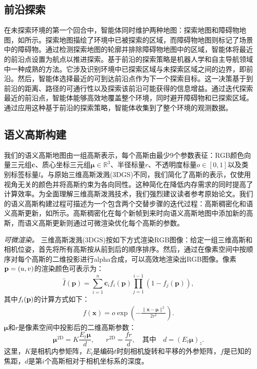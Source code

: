 \subsection{前沿探索}

在未探索环境的第一个回合中，智能体同时维护两种地图：探索地图和障碍物地图，如所示。探索地图描绘了环境中已被探索的区域，而障碍物地图则标记了场景中的障碍物。通过检测探索地图的轮廓并排除障碍物地图中的区域，智能体将最近的前沿点设置为航点以推进探索。基于前沿的探索策略是机器人学和自主导航领域中一种成熟的方法\cite{yamauchi1997frontier, holz2010evaluating}。它涉及识别环境中已探索区域与未探索区域之间的边界，即前沿。然后，智能体选择最近的可到达前沿点作为下一个探索目标。这一决策基于到前沿的距离、路径的可通行性以及探索该前沿可能获得的信息增益\cite{julia2012comparison}。通过迭代探索最近的前沿点，智能体能够高效地覆盖整个环境，同时避开障碍物和已探索区域。通过应用这种基于前沿的探索策略，智能体收集到了整个环境的观测数据。

\subsection{语义高斯构建}

我们的语义高斯地图由一组高斯表示，每个高斯由最少9个参数表征：RGB颜色向量三元组$\mathbf{c}$、质心坐标三元组$\bm{\mu} \in \mathbb{R}^3$、半径标量$r$、不透明度标量$o \in [0,1]$以及类别标签标量$l$。与原始三维高斯泼溅(3DGS)\cite{kerbl3Dgaussians}不同，我们简化了高斯的表示，仅使用视角无关的颜色并将高斯约束为各向同性。这种简化在降低内存需求的同时提高了计算效率。为全面理解三维高斯泼溅技术，我们强烈建议读者参考原始论文\cite{kerbl3Dgaussians}。我们的语义高斯构建过程可描述为一个包含两个交替步骤的迭代过程：高斯稠密化和语义高斯更新，如所示。高斯稠密化在每个新帧到来时向语义高斯地图中添加新的高斯，而语义高斯更新则通过可微渲染优化每个高斯的参数。

\textit{可微渲染。} 三维高斯泼溅(3DGS)\cite{kerbl3Dgaussians}按如下方式渲染RGB图像：给定一组三维高斯和相机位姿，首先将所有高斯按从前到后的顺序排序。然后，通过在像素空间中按顺序对每个高斯的二维投影进行alpha合成，可以高效地渲染出RGB图像。像素${\bf p} = (u,v)$的渲染颜色可表示为：
\begin{equation}
\hat{I}(\mathbf{p}) = \sum_{i=1}^{n} \mathbf{c}_i f_i(\mathbf{p}) \prod_{j=1}^{i-1} (1 - f_j(\mathbf{p})),
\end{equation}
其中$f_i(\bf{p})$的计算方式如下：
\begin{align}
    f(\mathbf{x}) = o \exp\left(-\frac{\|\mathbf{x} - \boldsymbol{\mu}\|^2}{2r^2}\right).\label{eq:gauss}
\end{align}
$\boldsymbol{\mu}$和$r$是像素空间中投影后的二维高斯参数：
\begin{equation}
    \boldsymbol{\mu}^{\textrm{2D}} = K \frac{E_t \boldsymbol{\mu}}{d}, \;\;\;\;\;\;
r^{\textrm{2D}} = \frac{f r}{d}, %
\quad \text{其中} \quad d = (E_t \boldsymbol{\mu})_z.
\end{equation}
这里，$K$是相机内参矩阵，$E_t$是编码$t$时刻相机旋转和平移的外参矩阵，$f$是已知的焦距，$d$是第$i$个高斯相对于相机坐标系的深度。

